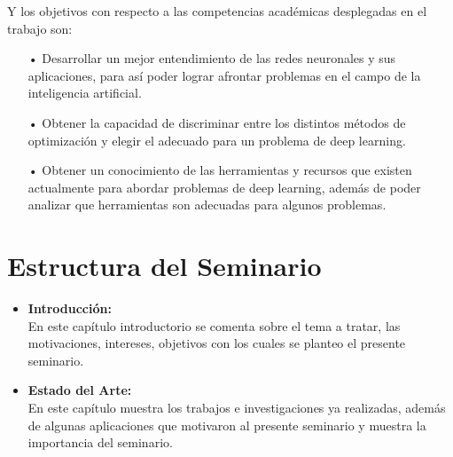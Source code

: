 Y los objetivos con respecto a las competencias académicas desplegadas en el trabajo son:
\begin{itemize}
\item[•] Desarrollar un mejor entendimiento de las redes neuronales y sus aplicaciones, para así poder lograr afrontar problemas en el campo de la inteligencia artificial. %
\item[•] Obtener la capacidad de discriminar entre los distintos métodos de optimización y elegir el adecuado para un problema de deep learning.%
\item[•] Obtener un conocimiento de las herramientas y recursos que existen actualmente para abordar problemas de deep learning, además de poder analizar que herramientas son adecuadas para algunos problemas.
\end{itemize}

\section{Estructura del Seminario}


\begin{itemize}

\item \textbf{Introducción:} \\
En este capítulo introductorio se comenta sobre el tema a tratar, las motivaciones, intereses, objetivos con los cuales se planteo el presente seminario.

\item \textbf{Estado del Arte:} \\
En este capítulo muestra los trabajos e investigaciones ya realizadas, además de algunas aplicaciones que motivaron al presente seminario y muestra la importancia del seminario.



\end{itemize}




